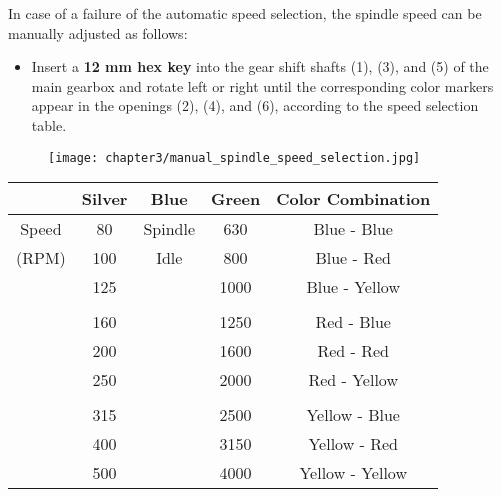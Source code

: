 \setcounter{section}{3}
\setcounter{page}{2}

In case of a failure of the automatic speed selection, the spindle speed can be manually adjusted as follows:

\begin{itemize}
    \item Insert a \textbf{12 mm hex key} into the gear shift shafts (1), (3), and (5) of the main gearbox and rotate left or right until the corresponding color markers appear in the openings (2), (4), and (6), according to the speed selection table.
\end{itemize}

\begin{figure}[h]
    \centering
    \texttt{[image: chapter3/manual\_spindle\_speed\_selection.jpg]}
    \label{fig:manual_spindle_speed_selection}
\end{figure}

\begin{table}[h]
    \centering
    \renewcommand{\arraystretch}{1.3}
    \begin{tabular}{|c|c|c|c|c|}
        \hline \hline
        \textbf{} & \textbf{Silver} & \textbf{Blue} & \textbf{Green} & \textbf{Color Combination} \\
        \hline \hline
        Speed   & 80    &   Spindle & 630  & Blue - Blue  \\
        (RPM)   & 100   &   Idle    & 800  & Blue - Red   \\
                & 125   &           & 1000 & Blue - Yellow \\
                &       &           &       &               \\
                & 160   &           & 1250 & Red - Blue  \\
                & 200   &           & 1600 & Red - Red   \\
                & 250   &           & 2000 & Red - Yellow \\
                &       &           &       &               \\
                & 315   &           & 2500 & Yellow - Blue \\
                & 400   &           & 3150 & Yellow - Red  \\
                & 500   &           & 4000 & Yellow - Yellow \\
        \hline \hline
    \end{tabular}
    \label{tab:spindle_speed}
\end{table}

